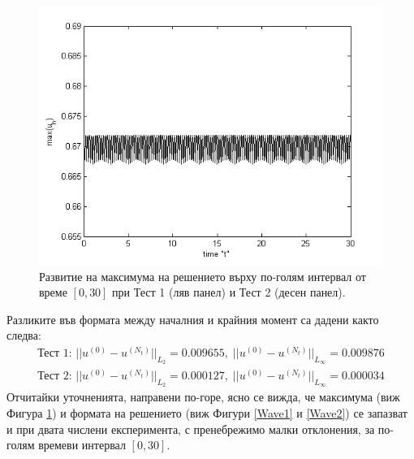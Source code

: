 \documentclass[a4paper]{article}
\theoremstyle{remark}
\begin{document}
\begin{large}
\begin{figure}
\begin{minipage}[b]{0.40\linewidth}
		 \includegraphics[width=\linewidth]{../amitans/figures/maximum_30_T30_bt1_c090_h020.png}
	\end{minipage}
\caption{Развитие на максимума на решението върху по-голям интервал от време $[0, 30]$ при Тест 1 (ляв панел) и Тест 2 (десен панел).}
\label{Maximum}
\end{figure}
\FloatBarrier
Разликите във формата между началния и крайния момент са дадени както следва:
\begin{align*}
\text{Тест 1: } ||u^{(0)} - u^{(N_t)}||_{L_2} = 0.009655, \; ||u^{(0)} - u^{(N_t)}||_{L_\infty} = 0.009876 \\
\text{Тест 2: } ||u^{(0)} - u^{(N_t)}||_{L_2} = 0.000127, \; ||u^{(0)} - u^{(N_t)}||_{L_\infty} = 0.000034
\end{align*}
Отчитайки уточненията, направени по-горе, ясно се вижда, че максимума (виж Фигура \ref{Maximum}) и формата на решението (виж Фигури \ref{Wave1} и \ref{Wave2}) се запазват и при двата числени експеримента, с пренебрежимо малки отклонения, за по-голям времеви интервал $[0, 30]$. 


\end{large}
\end{document}
